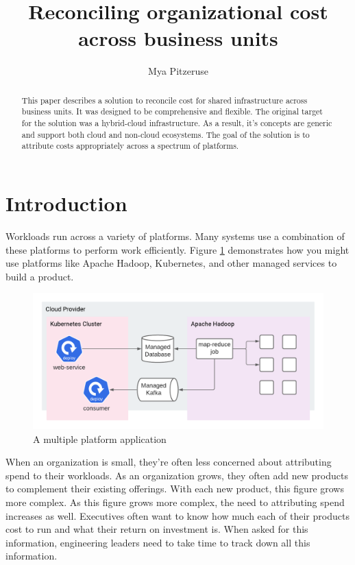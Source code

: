 \documentclass[10pt, a4paper, twocolumn]{article}
\title{Reconciling organizational cost across business units}
\author{Mya Pitzeruse}
\begin{document}
\maketitle

\begin{abstract}
  This paper describes a solution to reconcile cost for shared infrastructure across business units.
  It was designed to be comprehensive and flexible.
  The original target for the solution was a hybrid-cloud infrastructure.
  As a result, it's concepts are generic and support both cloud and non-cloud ecosystems.
  The goal of the solution is to attribute costs appropriately across a spectrum of platforms.
\end{abstract}


\section*{Introduction}
  Workloads run across a variety of platforms.
  Many systems use a combination of these platforms to perform work efficiently.
  Figure \ref{figure:1} demonstrates how you might use platforms like Apache Hadoop, Kubernetes, and other managed services to build a product.

  \begin{figure}[H]
    \centering
    \includegraphics[width=\linewidth]{./truth-and-reconciliation-application.png}
    \caption{A multiple platform application}
    \label{figure:1}
  \end{figure}

  When an organization is small, they're often less concerned about attributing spend to their workloads.
  As an organization grows, they often add new products to complement their existing offerings.
  With each new product, this figure grows more complex.
  As this figure grows more complex, the need to attributing spend increases as well.
  Executives often want to know how much each of their products cost to run and what their return on investment is.
  When asked for this information, engineering leaders need to take time to track down all this information.
\end{document}
